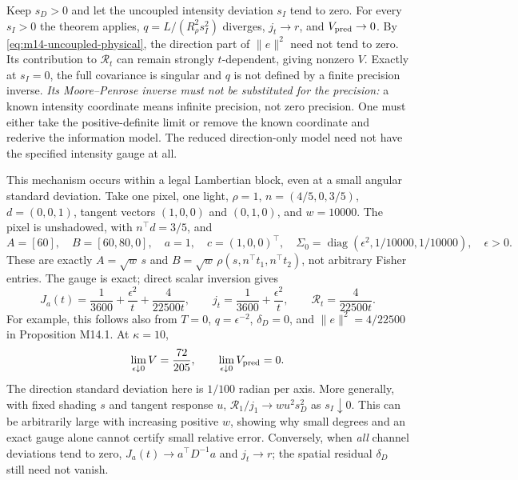 Keep $s_D>0$ and let the uncoupled intensity deviation $s_I$ tend to zero.
For every $s_I>0$ the theorem applies, $q=L/(R_\rho^2s_I^2)$ diverges,
$j_t\to r$, and $V_{\rm pred}\to0$.  By
\eqref{eq:m14-uncoupled-physical}, the direction part of $\|e\|^2$ need not
tend to zero.  Its contribution to $\mathcal R_t$ can remain strongly
$t$-dependent, giving nonzero $V$.  Exactly at $s_I=0$, the full covariance
is singular and $q$ is not defined by a finite precision inverse.
\emph{Its Moore--Penrose inverse must not be substituted for the precision:}
a known intensity coordinate means infinite precision, not zero precision.
One must either take the positive-definite limit or remove the known
coordinate and rederive the information model.  The reduced direction-only
model need not have the specified intensity gauge at all.

This mechanism occurs within a legal Lambertian block, even at a small
angular standard deviation.  Take one pixel, one light, $\rho=1$,
$n=(4/5,0,3/5)$, $d=(0,0,1)$, tangent vectors $(1,0,0)$ and $(0,1,0)$,
and $w=10000$.  The pixel is unshadowed, with $n^\top d=3/5$, and
\begin{equation}
 A=[60],\quad B=[60,80,0],\quad a=1,\quad c=(1,0,0)^\top,\quad
 \Sigma_0=\operatorname{diag}(\epsilon^2,1/10000,1/10000),\quad\epsilon>0.
 \label{eq:m14-lambertian-counterexample}
\end{equation}
These are exactly $A=\sqrt w\,s$ and
$B=\sqrt w\,\rho(s,n^\top t_1,n^\top t_2)$, not arbitrary Fisher entries.
The gauge is exact; direct scalar inversion gives
\begin{equation}
 J_a(t)=\frac1{3600}+\frac{\epsilon^2}{t}+\frac4{22500t},\qquad
 j_t=\frac1{3600}+\frac{\epsilon^2}{t},\qquad
 \mathcal R_t=\frac4{22500t}.
 \label{eq:m14-counterexample-risk}
\end{equation}
For example, this follows also from $T=0$, $q=\epsilon^{-2}$,
$\delta_D=0$, and $\|e\|^2=4/22500$ in Proposition M14.1.
At $\kappa=10$,
\begin{equation}
 \lim_{\epsilon\downarrow0}V=\frac{72}{205},\qquad
 \lim_{\epsilon\downarrow0}V_{\rm pred}=0.
 \label{eq:m14-counterexample-value}
\end{equation}
The direction standard deviation here is $1/100$ radian per axis.
More generally, with fixed shading $s$ and tangent response $u$,
$\mathcal R_1/j_1\to w u^2s_D^2$ as $s_I\downarrow0$.
This can be arbitrarily large with increasing positive $w$, showing why
small degrees and an exact gauge alone cannot certify small relative error.
Conversely, when \emph{all} channel deviations tend to zero,
$J_a(t)\to a^\top D^{-1}a$ and $j_t\to r$; the spatial residual
$\delta_D$ still need not vanish.

